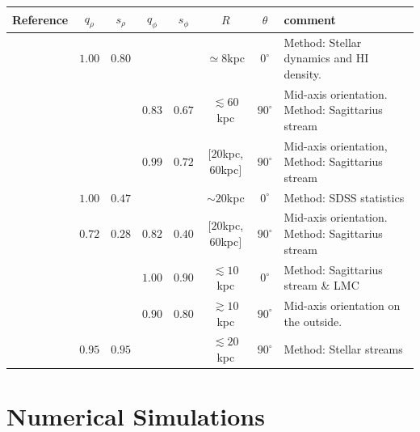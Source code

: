 \documentclass[a4paper,fleqn,usenatbib]{mnras}
\begin{document}
\begin{table}
\begin{tabular}{|c|cc|cc|c|c|p{4cm}|}\hline
Reference&$q_{\rho}$&$s_{\rho}$&$q_{\phi}$&$s_{\phi}$&$R$&$\theta$&comment\\ \hline \hline
\citet{Olling_and_Merrifield_2000}& $\mathbf{1.00}$ & $\mathbf{0.80}$ & & & $\simeq 8$kpc & $0^{\circ}$&Method: Stellar dynamics and HI density. \\\hline
\citet{Law_and_Majewski_2009}&&&$\mathbf{0.83}$&$\mathbf{0.67}$& $\lesssim 60$kpc&$90^{\circ}$&Mid-axis orientation. Method: Sagittarius stream\\\hline
%
\citet{Law_and_Majewski_2010}&&&$\mathbf{0.99}$&$\mathbf{0.72}$& $[20$kpc,$60$kpc$]$&$90^{\circ}$&Mid-axis orientation, Method: Sagittarius stream\\\hline
%
\citet{Loebman_et_al._2012}&$\mathbf{1.00}$&$\mathbf{0.47}$&&&$\sim 20$kpc &$0^{\circ}$&Method: SDSS statistics\\\hline
%
\citet{Deg_and_Widrow_2013}&$0.72$&$0.28$&$0.82$&$0.40$&$[20$kpc,$60$kpc$]$&$90^{\circ}$& Mid-axis orientation. Method: Sagittarius stream\\\hline
%
\multirow{2}{*}{\citet{Vera-Ciro_and_Helmi_2013}}&&&$\mathbf{1.00}$&$\mathbf{0.90}$&$\lesssim 10$kpc&$0^{\circ}$ & Method: Sagittarius stream \& LMC \\
&&&$\mathbf{0.90}$&$\mathbf{0.80}$&$\gtrsim 10$kpc&$90^{\circ}$& Mid-axis orientation on the outside. \\\hline
%
\citet{Bovy_et_el._2016}&$\mathbf{0.95}$&$\mathbf{0.95}$&&&$\lesssim 20$kpc&$90^{\circ}$ & Method: Stellar streams\\\hline

\end{tabular}
\end{table}



\section{Numerical Simulations}
\end{document}
